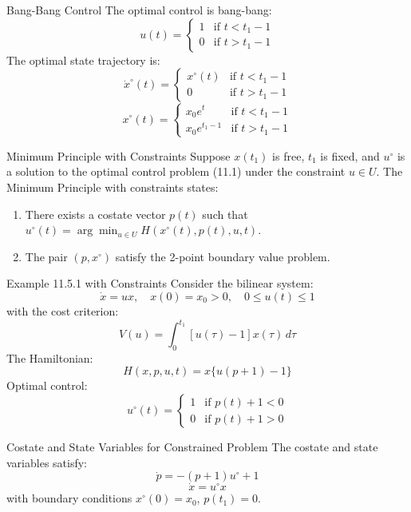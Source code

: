 \documentclass[10pt]{beamer}
\begin{document}
\begin{frame}[fragile]{Bang-Bang Control}
  The optimal control is bang-bang:
  \[
  u(t) = \begin{cases}
  1 & \text{if } t < t_1 - 1 \\
  0 & \text{if } t > t_1 - 1
  \end{cases}
  \]
  The optimal state trajectory is:
  \[
  \dot{x}^\circ(t) = \begin{cases}
  x^\circ(t) & \text{if } t < t_1 - 1 \\
  0 & \text{if } t > t_1 - 1
  \end{cases}
  \]
  \[
  x^\circ(t) = \begin{cases}
  x_0 e^t & \text{if } t < t_1 - 1 \\
  x_0 e^{t_1 - 1} & \text{if } t > t_1 - 1
  \end{cases}
  \]
\end{frame}
  
\begin{frame}[fragile]{Minimum Principle with Constraints}
  Suppose \( x(t_1) \) is free, \( t_1 \) is fixed, and \( u^\circ \) is a solution to the optimal control problem (11.1) under the constraint \( u \in U \). The Minimum Principle with constraints states:
  \begin{enumerate}
      \item There exists a costate vector \( p(t) \) such that \( u^\circ(t) = \arg \min_{u \in U} H(x^\circ(t), p(t), u, t) \).
      \item The pair \( (p, x^\circ) \) satisfy the 2-point boundary value problem.
  \end{enumerate}
\end{frame}
  
\begin{frame}[fragile]{Example 11.5.1 with Constraints}
  Consider the bilinear system:
  \[
  \dot{x} = ux, \quad x(0) = x_0 > 0, \quad 0 \le u(t) \le 1
  \]
  with the cost criterion:
  \[
  V(u) = \int_0^{t_1} [u(\tau) - 1] x(\tau) \, d\tau
  \]
  The Hamiltonian:
  \[
  H(x, p, u, t) = x \{ u(p + 1) - 1 \}
  \]
  Optimal control:
  \[
  u^\circ(t) = \begin{cases}
  1 & \text{if } p(t) + 1 < 0 \\
  0 & \text{if } p(t) + 1 > 0
  \end{cases}
  \]
\end{frame}
  
\begin{frame}[fragile]{Costate and State Variables for Constrained Problem}
  The costate and state variables satisfy:
  \[
  \dot{p} = -(p + 1) u^\circ + 1
  \]
  \[
  \dot{x} = u^\circ x
  \]
  with boundary conditions \( x^\circ(0) = x_0 \), \( p(t_1) = 0 \).
\end{frame}
  
\end{document}
